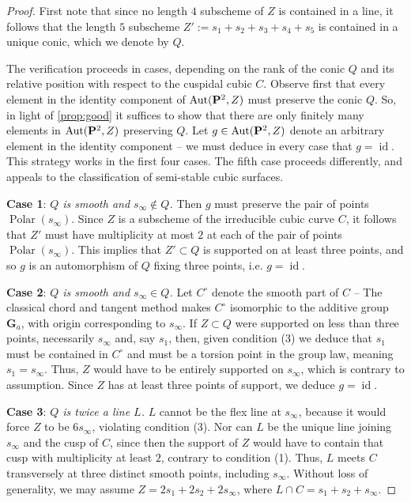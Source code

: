\documentclass[12pt,reqno]{amsart}
\DeclareMathOperator{\id}{id}
\DeclareMathOperator{\Polar}{Polar}
\numberwithin{equation}{section}
\newcommand{\G}{\mathbf G}
\begin{document}
\begin{proof}
  First note that since no length $4$ subscheme of $Z$ is contained in
  a line, it follows that the length $5$ subscheme
  $Z' := s_1 + s_2 + s_3 +s_4 +s_5$ is contained in a unique conic,
  which we denote by $Q$.

  The verification proceeds in cases, depending on the rank of the
  conic $Q$ and its relative position with respect to the cuspidal
  cubic $C$.  Observe first that every element in the identity
  component of $\operatorname{Aut}({\bf P}^{2},Z)$ must preserve the conic $Q$. So, in
  light of \autoref{prop:good} it suffices to show that there are only
  finitely many elements in $\operatorname{Aut}({\bf P}^{2},Z)$ preserving $Q$.  Let
  $g \in \operatorname{Aut}({\bf P}^{2},Z)$ denote an arbitrary element in the identity
  component -- we must deduce in every case that $g = \id$.  This
  strategy works in the first four cases. The fifth case proceeds
  differently, and appeals to the classification of semi-stable cubic
  surfaces.

  
  {\bf Case 1}: {\sl $Q$ is smooth and $s_{\infty} \notin Q$.}    Then
  $g$ must preserve the pair of points $\Polar(s_{\infty})$. Since $Z$
  is a subscheme of the irreducible cubic curve $C$, it follows that
  $Z'$ must have multiplicity at most $2$ at each of the pair of
  points $\Polar(s_{\infty})$.  This implies that $Z' \subset Q$ is
  supported on at least three points, and so $g$ is an automorphism of
  $Q$ fixing three points, i.e. $g = \id$.

  

  {\bf Case 2}: {\sl $Q$ is smooth and $s_{\infty} \in Q$.}  Let
  $C^{\circ}$ denote the smooth part of $C$ -- The classical chord and
  tangent method makes $C^{\circ}$ isomorphic to the additive group
  $\G_{a}$, with origin corresponding to $s_{\infty}$. If
  $Z \subset Q$ were supported on less than three points, necessarily
  $s_{\infty}$ and, say $s_{1}$, then, given condition (3) we deduce
  that $s_{1}$ must be contained in $C^{\circ}$ and must be a torsion
  point in the group law, meaning $s_{1} = s_{\infty}$. Thus, $Z$
  would have to be entirely supported on $s_{\infty}$, which is
  contrary to assumption.  Since $Z$ has at least three points of
  support, we deduce $g =\id$.

  
  {\bf Case 3}: {\sl $Q$ is twice a line $L$.} $L$ cannot be the flex
  line at $s_{\infty}$, because it would force $Z$ to be
  $6 s_{\infty}$, violating condition (3).  Nor can $L$ be the unique
  line joining $s_{\infty}$ and the cusp of $C$, since then the
  support of $Z$ would have to contain that cusp with multiplicity at
  least $2$, contrary to condition (1). Thus, $L$ meets $C$
  transversely at three distinct smooth points, including
  $s_{\infty}$.  Without loss of generality, we may assume
  $Z = 2s_1 + 2s_2 + 2s_{\infty}$, where
  $L \cap C = s_{1}+s_{2} + s_{\infty}$.


\end{proof}
\end{document}
